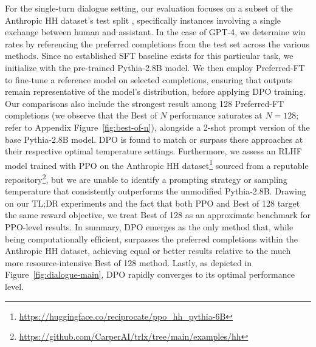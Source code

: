 For the single-turn dialogue setting, our evaluation focuses on a subset of the Anthropic HH dataset's test split \citep{bai2022training}, specifically instances involving a single exchange between human and assistant. In the case of GPT-4, we determine win rates by referencing the preferred completions from the test set across the various methods. Since no established SFT baseline exists for this particular task, we initialize with the pre-trained Pythia-2.8B model. We then employ Preferred-FT to fine-tune a reference model on selected completions, ensuring that outputs remain representative of the model's distribution, before applying DPO training. Our comparisons also include the strongest result among 128 Preferred-FT completions (we observe that the Best of $N$ performance saturates at $N=128$; refer to Appendix Figure~\ref{fig:best-of-n}), alongside a 2-shot prompt version of the base Pythia-2.8B model. DPO is found to match or surpass these approaches at their respective optimal temperature settings. Furthermore, we assess an RLHF model trained with PPO on the Anthropic HH dataset\footnote{\url{https://huggingface.co/reciprocate/ppo_hh_pythia-6B}} sourced from a reputable repository\footnote{\url{https://github.com/CarperAI/trlx/tree/main/examples/hh}}, but we are unable to identify a prompting strategy or sampling temperature that consistently outperforms the unmodified Pythia-2.8B. Drawing on our TL;DR experiments and the fact that both PPO and Best of 128 target the same reward objective, we treat Best of 128 as an approximate benchmark for PPO-level results. In summary, DPO emerges as the only method that, while being computationally efficient, surpasses the preferred completions within the Anthropic HH dataset, achieving equal or better results relative to the much more resource-intensive Best of 128 method. Lastly, as depicted in Figure~\ref{fig:dialogue-main}, DPO rapidly converges to its optimal performance level.

